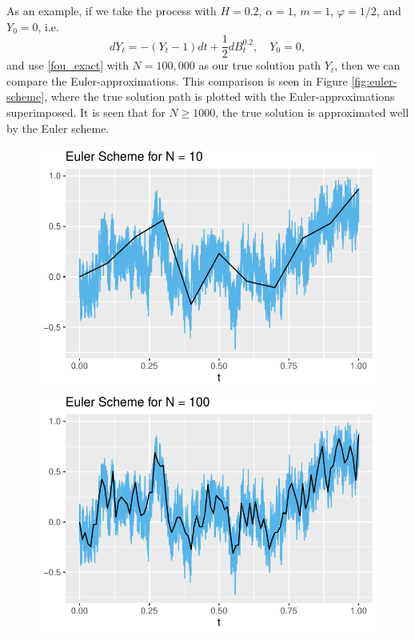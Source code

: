 As an example, if we take the process with $H=0.2$, $\alpha = 1$, $m=1$, $\varphi=1/2$, and $Y_{0}=0$, i.e.
\begin{equation}
    dY_{t}=-(Y_{t}-1)dt+\frac{1}{2}dB^{0.2}_{t},\quad Y_{0}=0,
\end{equation}
and use \eqref{fou_exact} with $N=100,000$ as our true solution path $Y_{t}$, then we can compare the Euler-approximations. This comparison is seen in Figure \ref{fig:euler-scheme}, where the true solution path is plotted with the Euler-approximations superimposed. It is seen that for $N\geq 1000$, the true solution is approximated well by the Euler scheme.
\begin{figure}[H]
    \centering
    \includegraphics[scale=0.52]{fig/img/EulerScheme/EulerScheme10.pdf}
    \includegraphics[scale=0.52]{fig/img/EulerScheme/EulerScheme100.pdf}

\end{figure}
